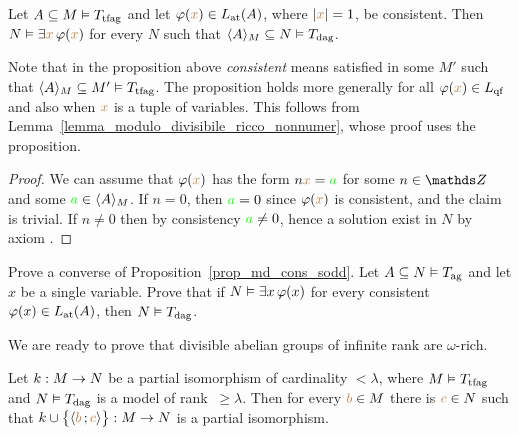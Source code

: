 \begin{proposition}\label{prop_md_cons_sodd}
Let $A\subseteq M\models T_{\rm tfag}$ and let $\phi({\mr x})\in L_{\rm at}(A)$, where $|{\mr x}|=1$, be consistent.
%
Then $N\models\E {\mr x} \,\phi({\mr x})$ for every $N$ such that $\<A\>_M\subseteq N\models T_{\rm dag}$.
\end{proposition}

Note that in the proposition above  \textit{consistent\/} means satisfied in some $M'$ such that $\<A\>_M\subseteq M'\models T_{\rm tfag}$.
The proposition holds more generally for all $\phi({\mr x})\in L_{\rm qf}$ and also when ${\mr x}$ is a tuple of variables.
%
This follows from Lemma~\ref{lemma_modulo_divisibile_ricco_nonnumer}, whose proof uses the proposition.

\begin{proof}
We can assume that $\phi({\mr x})$ has the form $n {\mr x}= {\gr a}$ for some $n\in\ZZ$ and some ${\gr a}\in\<A\>_M$.
%
If $n=0$, then ${\gr a}=0$ since $\phi({\mr x})$ is consistent, and the claim is trivial.
%
If $n\neq0$ then by consistency ${\gr a}\neq0$, hence a solution exist in $N$ by axiom .
\end{proof}

\begin{exercise}
Prove a converse of Proposition~\ref{prop_md_cons_sodd}.
%
Let $A\subseteq N\models T_{\rm ag}$ and let $x$ be a single variable.
%
Prove that if $N\models\E x \,\phi(x)$ for every consistent $\phi(x)\in L_{\rm at}(A)$, then $N\models T_{\rm dag}$.
\end{exercise}

We are ready to prove that divisible abelian groups of infinite rank are $\omega$-rich.

\begin{lemma}\label{lemma_modulo_divisibile_ricco_nonnumer}
Let $k:M\imp N$ be a partial isomorphism of cardinality $<\lambda$, where $M\models T_{\rm tfag}$ and $N\models T_{\rm dag}$ is a model of rank $\ \ge\lambda$.
%
Then for every ${\mr b}\in M$ there is ${\mr c}\in N$ such that $k\cup\big\{\<{\mr b}\,;{\mr c}\>\big\}:M\imp N$ is a partial isomorphism.
\end{lemma}

